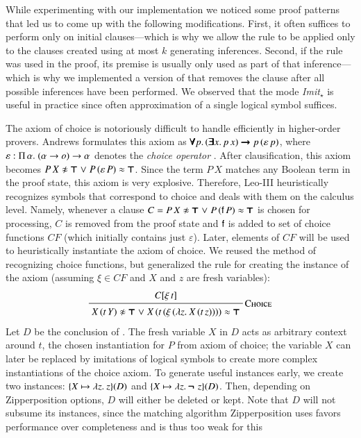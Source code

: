While experimenting with our implementation we noticed some proof patterns that
led us to come up with the following modifications. First, it often suffices to
perform  only on initial clauses---which is why we allow the rule to
be applied only to the clauses created using at most $k$ generating inferences.
Second, if the rule was used in the proof, its premise is usually only used as
part of that inference---which is why we implemented a version of 
that removes the clause after all possible  inferences have been
performed. We observed that the mode \emph{Imit}$_\star$ is useful in practice
since often approximation of a single logical symbol suffices.

The axiom of choice is notoriously difficult to handle efficiently in higher-order provers. Andrews formulates
this axiom as $\pmb{\forall} p.\, (\pmb{\exists}
x.\, p \, x) \pmb{\rightarrow} p \, (\varepsilon \, p)$, where $\varepsilon :
\Pi\,\alpha.\;(\alpha \rightarrow o) \rightarrow \alpha$ denotes the \emph{choice
operator} \cite{pa-01-classical-ty-thy}. After clausification, this axiom becomes $P \, X \noteq \itrue \llor P
\, (\varepsilon \, P) \eq \itrue$. Since the term $P \, X$ matches any Boolean
term in the proof state, this axiom is very explosive. Therefore, Leo-III
\cite{sb-21-leo3} heuristically recognizes symbols that correspond to choice and deals with
them on the calculus level. Namely, whenever a clause $C = P \, X \noteq \itrue \llor P \, (\cst{f} \,
P) \eq \itrue$ is chosen for processing, $C$ is removed from the proof state and $\mathsf{f}$ is
added to set of choice functions $\mathit{CF}$ (which initially contains just
$\varepsilon$). Later, elements of $\mathit{CF}$ will be used to heuristically
instantiate the axiom of choice. We reused the method of recognizing choice
functions, but generalized the rule for creating the instance of
the axiom (assuming $\xi \in \mathit{CF}$ and $X$ and $z$ are fresh variables):
%
$$\namedinference{Choice}
               {C[\xi \, t]}
               { X \, (t \, Y) \noteq \itrue \llor X \, (t \, (\xi \, (\lam{z}{X \, (t \, z)})) ) \eq \itrue }$$
%
Let $D$ be the conclusion of . The fresh variable $X$ in $D$ acts as
arbitrary context around $t$, the chosen instantiation for $P$ from axiom of choice;
the variable $X$ can later be replaced by imitations of logical symbols to create more
complex instantiations of the choice axiom. To generate useful instances early, we create two instances: $\{X
\mapsto \lambda z.\> z\}(D)$ and $\{X \mapsto \lambda z.\> \pmb{\neg\,}\, z\}(D)$. Then, depending on
Zipperposition options, $D$ will either be deleted or kept. Note that $D$
will not subsume its instances, since the matching algorithm Zipperposition uses favors performance over completeness and is
thus too weak for this \cite[Sect.~6]{bbtvw-21-sup-lam}

